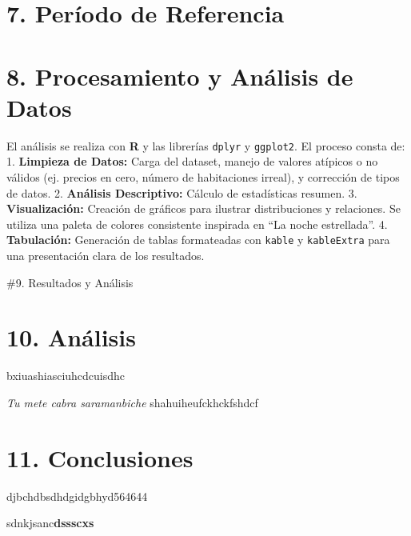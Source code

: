 \documentclass[oneside,11pt]{Latex/Classes/PhDthesisPSnPDF}
\begin{document}
\section{7. Período de Referencia}\label{peruxedodo-de-referencia}

\section{8. Procesamiento y Análisis de
Datos}\label{procesamiento-y-anuxe1lisis-de-datos}

El análisis se realiza con \textbf{R} y las librerías \texttt{dplyr} y
\texttt{ggplot2}. El proceso consta de: 1. \textbf{Limpieza de Datos:}
Carga del dataset, manejo de valores atípicos o no válidos (ej. precios
en cero, número de habitaciones irreal), y corrección de tipos de datos.
2. \textbf{Análisis Descriptivo:} Cálculo de estadísticas resumen. 3.
\textbf{Visualización:} Creación de gráficos para ilustrar
distribuciones y relaciones. Se utiliza una paleta de colores
consistente inspirada en ``La noche estrellada''. 4.
\textbf{Tabulación:} Generación de tablas formateadas con \texttt{kable}
y \texttt{kableExtra} para una presentación clara de los resultados.

\#9. Resultados y Análisis

\section{10. Análisis}\label{anuxe1lisis}

bxiuashiasciuhcdcuisdhc

\emph{Tu mete cabra saramanbiche} shahuiheufckhckfshdcf

\section{11. Conclusiones}\label{conclusiones}

djbchdbsdhdgidgbhyd564644

sdnkjsanc\textbf{dssscxs}

\renewcommand{\bibname}{Lista de Referencias}
 
 

\end{document}
